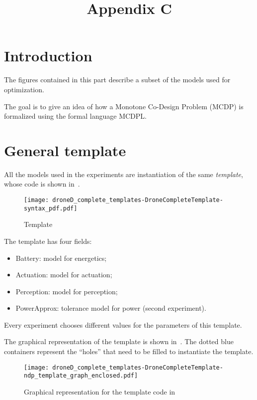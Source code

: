 \documentclass{article}
\begin{document}
\title{Appendix C}

\section{Introduction}

The figures contained in this part describe a subset of the models used for optimization.

The goal is to give an idea of how a Monotone Co-Design Problem (MCDP) is formalized using 
the formal language MCDPL.

\clearpage

\section{General template}

All the models used in the experiments are instantiation of the 
same \emph{template}, whose code is shown in~.

\begin{figure}[h!]
        \caption{Template \label{fig:template}}
        \texttt{[image: droneD\_complete\_templates-DroneCompleteTemplate-syntax\_pdf.pdf]}
    \end{figure}

The template has four fields:
\begin{itemize}
\item Battery: model for energetics;
\item Actuation: model for actuation;
\item Perception: model for perception;
\item PowerApprox: tolerance model for power (second experiment).
\end{itemize}

Every experiment chooses different values for the parameters of this template.

The graphical representation of the template is shown in~.
The dotted blue containers represent the ``holes'' that need to be filled to instantiate the template.


    \begin{figure}[h!]
        \caption{Graphical representation for the template code in~ \label{fig:template-graph}}

        \centering
        \texttt{[image: droneD\_complete\_templates-DroneCompleteTemplate-ndp\_template\_graph\_enclosed.pdf]}
        
    \end{figure}
\end{document}
